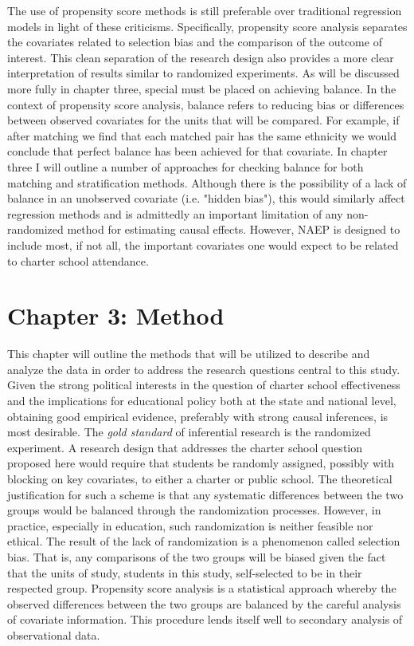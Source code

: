 \documentclass[letterpaper,12p,twoside]{article} %
\begin{document}
The use of propensity score methods is still preferable over traditional regression models in light of these criticisms. Specifically, propensity score analysis separates the covariates related to selection bias and the comparison of the outcome of interest. This clean separation of the research design also provides a more clear interpretation of results similar to randomized experiments. As will be discussed more fully in chapter three, special must be placed on achieving balance. In the context of propensity score analysis, balance refers to reducing bias or differences between observed covariates for the units that will be compared. For example, if after matching we find that each matched pair has the same ethnicity we would conclude that perfect balance has been achieved for that covariate. In chapter three I will outline a number of approaches for checking balance for both matching and stratification methods. Although there is the possibility of a lack of balance in an unobserved covariate (i.e. "hidden bias"), this would similarly affect regression methods and is admittedly an important limitation of any non-randomized method for estimating causal effects. However, NAEP is designed to include most, if not all, the important covariates one would expect to be related to charter school attendance.


\cleardoublepage
\section{Chapter 3: Method}
This chapter will outline the methods that will be utilized to describe and analyze the data in order to address the research questions central to this study. Given the strong political interests in the question of charter school effectiveness and the implications for educational policy both at the state and national level, obtaining good empirical evidence, preferably with strong causal inferences, is most desirable. The \textit{gold standard} of inferential research is the randomized experiment. A research design that addresses the charter school question proposed here would require that students be randomly assigned, possibly with blocking on key covariates, to either a charter or public school. The theoretical justification for such a scheme is that any systematic differences between the two groups would be balanced through the randomization processes. However, in practice, especially in education, such randomization is neither feasible nor ethical. The result of the lack of randomization is a phenomenon called selection bias. That is, any comparisons of the two groups will be biased given the fact that the units of study, students in this study, self-selected to be in their respected group. Propensity score analysis \cite{RosenbaumRubin1983} is a statistical approach whereby the observed differences between the two groups are balanced by the careful analysis of covariate information. This procedure lends itself well to secondary analysis of observational data.
\end{document}
